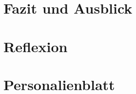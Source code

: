 \documentclass[
11pt, %
a4paper, %
BCOR25mm, %
DIV14, %
footsepline = false, %
headsepline, %
twoside, %
openright,
abstracton, %
listof=totocnumbered, %
bibliography=totocnumbered %
]{scrreprt}
\begin{document}
  

  \cleardoublepage
  
   
  \chapter{Fazit und Ausblick}\label{chapter:FazitUndAusblick}
  
  

  \cleardoublepage
  
  
  \chapter{Reflexion}\label{chapter:Reflexion}
  
   
  
  \cleardoublepage
  
  
  \appendix
  
  
  
  \chapter{Personalienblatt}\label{chapter:Personalienblatt}

  
  
\end{document}
